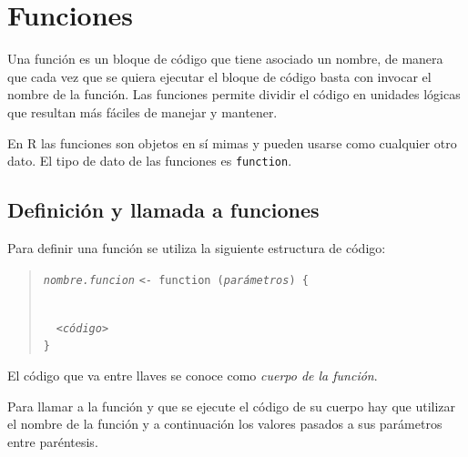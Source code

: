 \documentclass[
  a4paper,
]{scrreport}
\theoremstyle{definition}
\theoremstyle{definition}
\theoremstyle{remark}
\begin{document}

\chapter{Funciones}\label{funciones}

Una función es un bloque de código que tiene asociado un nombre, de
manera que cada vez que se quiera ejecutar el bloque de código basta con
invocar el nombre de la función. Las funciones permite dividir el código
en unidades lógicas que resultan más fáciles de manejar y mantener.

En R las funciones son objetos en sí mimas y pueden usarse como
cualquier otro dato. El tipo de dato de las funciones es
\texttt{function}.

\section{Definición y llamada a
funciones}\label{definiciuxf3n-y-llamada-a-funciones}

Para definir una función se utiliza la siguiente estructura de código:

\begin{quote}
\emph{\texttt{nombre.funcion}}
\texttt{\textless{}-\ function\ (}\emph{\texttt{parámetros}}\texttt{)\ \{}\strut \\
  \emph{\texttt{\textless{}código\textgreater{}}}\\
\texttt{\}}
\end{quote}

El código que va entre llaves se conoce como \emph{cuerpo de la
función}.

Para llamar a la función y que se ejecute el código de su cuerpo hay que
utilizar el nombre de la función y a continuación los valores pasados a
sus parámetros entre paréntesis.
\end{document}
